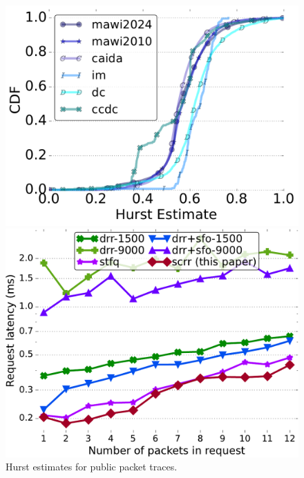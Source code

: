 \begin{figure}[t]

 \centering
  \begin{minipage}[t]{0.32\textwidth}
   	 \centering
    \includegraphics[width=\linewidth]{figs/hursts.pdf}
    \vspace{-7mm}
    \caption{\small{Hurst estimates for public packet traces.}}
	\label{fig:trace-hurst}
  \end{minipage}
  \begin{minipage}[t]{0.32\textwidth}
   	 \centering
    \includegraphics[width=\linewidth]{figs/pkt_num_lat_cn_2t4x16_mn_2tb2x4_mss_150_bql_9k_comp_fah.pdf}
    \vspace{-7mm}

\end{minipage}
\end{figure}
